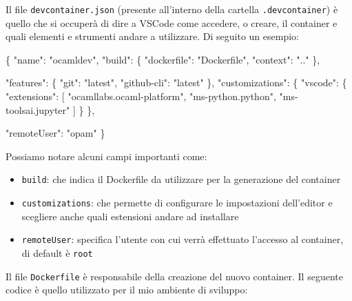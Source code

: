 \documentclass[11pt]{article}
\providecommand{\tightlist}{%
      \setlength{\itemsep}{0pt}\setlength{\parskip}{0pt}}
\newenvironment{Shaded}{}{}
\newcommand{\DataTypeTok}[1]{\textcolor[rgb]{0.56,0.13,0.00}{{#1}}}
\newcommand{\StringTok}[1]{\textcolor[rgb]{0.25,0.44,0.63}{{#1}}}
\newcommand{\OtherTok}[1]{\textcolor[rgb]{0.00,0.44,0.13}{{#1}}}
\newcommand{\FunctionTok}[1]{\textcolor[rgb]{0.02,0.16,0.49}{{#1}}}
\begin{document}
Il file \texttt{devcontainer.json} (presente all'interno della cartella
\texttt{.devcontainer}) è quello che si occuperà di dire a VSCode come
accedere, o creare, il container e quali elementi e strumenti andare a
utilizzare. Di seguito un esempio:

\begin{Shaded}
\begin{Highlighting}[]
\FunctionTok{\{}
    \DataTypeTok{"name"}\FunctionTok{:} \StringTok{"ocamldev"}\FunctionTok{,}
    \DataTypeTok{"build"}\FunctionTok{:} \FunctionTok{\{}
        \DataTypeTok{"dockerfile"}\FunctionTok{:} \StringTok{"Dockerfile"}\FunctionTok{,}
        \DataTypeTok{"context"}\FunctionTok{:} \StringTok{".."}
    \FunctionTok{\},}

    \DataTypeTok{"features"}\FunctionTok{:} \FunctionTok{\{}
        \DataTypeTok{"git"}\FunctionTok{:} \StringTok{"latest"}\FunctionTok{,}
        \DataTypeTok{"github{-}cli"}\FunctionTok{:} \StringTok{"latest"}
    \FunctionTok{\},}
    \DataTypeTok{"customizations"}\FunctionTok{:} \FunctionTok{\{}
        \DataTypeTok{"vscode"}\FunctionTok{:} \FunctionTok{\{}
            \DataTypeTok{"extensions"}\FunctionTok{:} \OtherTok{[}
                \StringTok{"ocamllabs.ocaml{-}platform"}\OtherTok{,}
                \StringTok{"ms{-}python.python"}\OtherTok{,}
                \StringTok{"ms{-}toolsai.jupyter"}
            \OtherTok{]}
        \FunctionTok{\}}
    \FunctionTok{\},}

    \DataTypeTok{"remoteUser"}\FunctionTok{:} \StringTok{"opam"}
\FunctionTok{\}}
\end{Highlighting}
\end{Shaded}

Possiamo notare alcuni campi importanti come:

\begin{itemize}
\tightlist
\item
  \texttt{build}: che indica il Dockerfile da utilizzare per la
  generazione del container
\item
  \texttt{customizations}: che permette di configurare le impostazioni
  dell'editor e scegliere anche quali estensioni andare ad installare
\item
  \texttt{remoteUser}: specifica l'utente con cui verrà effettuato
  l'accesso al container, di default è \texttt{root}
\end{itemize}

\newpage

Il file \texttt{Dockerfile} è responsabile della creazione del nuovo
container. Il seguente codice è quello utilizzato per il mio ambiente di
sviluppo:
\end{document}
